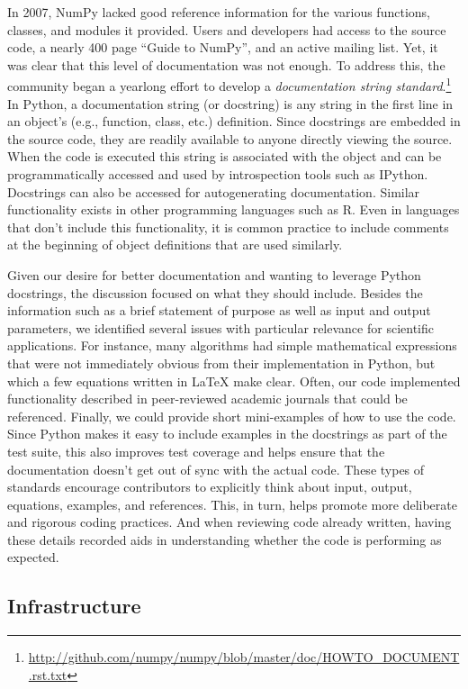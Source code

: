 \documentclass[11pt,oneside,english]{article}
\begin{document}
In 2007, NumPy lacked good reference information for the various functions,
classes, and modules it provided. Users and developers had access to the source
code, a nearly 400 page ``Guide to NumPy'', and an active mailing list. Yet, it
was clear that this level of documentation was not enough. To address this, the
community began a yearlong effort to develop a \emph{documentation string
standard}.\footnote{\url{http://github.com/numpy/numpy/blob/master/doc/HOWTO_DOCUMENT.rst.txt}}
In Python, a documentation string (or docstring) is any string in the first
line in an object's (e.g., function, class, etc.) definition. Since docstrings
are embedded in the source code, they are readily available to anyone directly
viewing the source. When the code is executed this string is associated with
the object and can be programmatically accessed and used by introspection tools
such as IPython.  Docstrings can also be accessed for autogenerating
documentation.  Similar functionality exists in other programming languages
such as R. Even in languages that don't include this functionality, it is
common practice to include comments at the beginning of object definitions that
are used similarly.

Given our desire for better documentation and wanting to leverage Python
docstrings, the discussion focused on what they should include. Besides the
information such as a brief statement of purpose as well as input and output
parameters, we identified several issues with particular relevance for
scientific applications.  For instance, many algorithms had simple mathematical
expressions that were not immediately obvious from their implementation in
Python, but which a few equations written in \LaTeX{} make clear.  Often, our
code implemented functionality described in peer-reviewed academic journals
that could be referenced. Finally, we could provide short mini-examples of how
to use the code. Since Python makes it easy to include examples in the
docstrings as part of the test suite, this also improves test coverage and
helps ensure that the documentation doesn't get out of sync with the actual
code. These types of standards encourage contributors to  explicitly think
about input, output, equations, examples, and references. This, in turn, helps
promote more deliberate and rigorous coding practices. And when reviewing code
already written, having these details recorded aids in understanding whether
the code is performing as expected.

\subsection{Infrastructure}\label{subsec:infrastructure}
\end{document}
